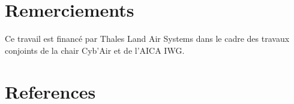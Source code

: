 \documentclass[contribution]{jfsma}
\begin{document}

\section*{Remerciements}

Ce travail est financé par Thales Land Air Systems dans le cadre des travaux conjoints de la chair Cyb'Air et de l'AICA IWG.

\section*{References}
\small


\end{document}
